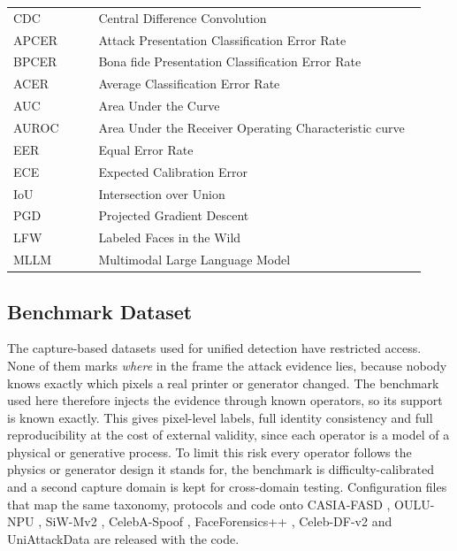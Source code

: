 \documentclass[conference]{IEEEtran}
\newcommand{\sub}[1]{\subsection{\texorpdfstring{\textbf{#1}}{#1}}}
\begin{document}
\begin{table}[t]
\begin{minipage}[t]{0.49\textwidth}
\begin{tabular}[t]{@{}p{0.20\linewidth}p{0.77\linewidth}@{}}
CDC & Central Difference Convolution \\
APCER & Attack Presentation Classification Error Rate \\
BPCER & Bona fide Presentation Classification Error Rate \\
ACER & Average Classification Error Rate \\
AUC & Area Under the Curve \\
AUROC & Area Under the Receiver Operating Characteristic curve \\
EER & Equal Error Rate \\
ECE & Expected Calibration Error \\
IoU & Intersection over Union \\
PGD & Projected Gradient Descent \\
LFW & Labeled Faces in the Wild \\
MLLM & Multimodal Large Language Model \\
\bottomrule
\end{tabular}
\end{minipage}
\end{table}

\sub{Benchmark Dataset}
The capture-based datasets used for unified detection
\cite{yu2024unified,ma2025uniattackplus} have restricted access. None of them marks
\emph{where} in the frame the attack evidence lies, because nobody knows exactly which
pixels a real printer or generator changed. The benchmark used here therefore injects
the evidence through known operators, so its support is known exactly. This gives
pixel-level labels, full identity consistency and full reproducibility at the cost of
external validity, since each operator is a model of a physical or generative process.
To limit this risk every operator follows the physics or generator design it stands
for, the benchmark is difficulty-calibrated and a second capture domain is kept for
cross-domain testing. Configuration files that map the same taxonomy, protocols and
code onto CASIA-FASD \cite{zhang2012casia}, OULU-NPU \cite{boulkenafet2017oulu},
SiW-Mv2 \cite{guo2022siwmv2}, CelebA-Spoof \cite{zhang2020celebaspoof},
FaceForensics++ \cite{rossler2019ff}, Celeb-DF-v2 \cite{li2020celebdf} and
UniAttackData \cite{yu2024unified} are released with the code.
\end{document}
